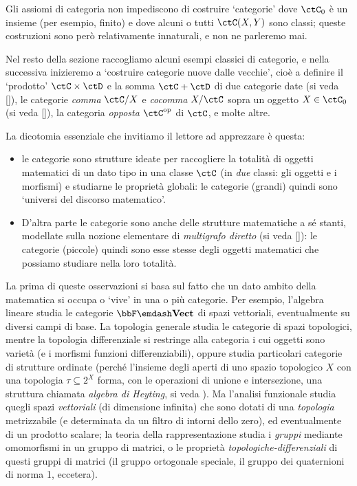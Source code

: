 \begin{remark}
	Gli assiomi di categoria non impediscono di costruire `categorie' dove \(\ctC_0\) è un insieme (per esempio, finito) e dove alcuni o tutti \(\Hom{\ctC}(X,Y)\) sono classi; queste costruzioni sono però relativamente innaturali, e non ne parleremo mai.
\end{remark}
Nel resto della sezione raccogliamo alcuni esempi classici di categorie, e nella successiva inizieremo a `costruire categorie nuove dalle vecchie', cioè a definire il `prodotto' \(\ctC\times\ctD\) e la somma \(\ctC+\ctD\) di due categorie date (si veda \autoref{}), le categorie \emph{comma} \(\ctC/X\) e \emph{cocomma} \(X/\ctC\) sopra un oggetto \(X\in\ctC_0\) (si veda \autoref{}), la categoria \emph{opposta} \(\ctC^\op\) di \(\ctC\), e molte altre.

La dicotomia essenziale che invitiamo il lettore ad apprezzare è questa:
\begin{itemize}
	\item le categorie sono strutture ideate per raccogliere la totalità di oggetti matematici di un dato tipo in una classe \(\ctC\) (in \emph{due} classi: gli oggetti e i morfismi) e studiarne le proprietà globali: le categorie (grandi) quindi sono `universi del discorso matematico'.
	\item D'altra parte le categorie sono anche delle strutture matematiche a sé stanti, modellate sulla nozione elementare di \emph{multigrafo diretto} (si veda \autoref{}): le categorie (piccole) quindi sono esse stesse degli oggetti matematici che possiamo studiare nella loro totalità.
\end{itemize}
La prima di queste osservazioni si basa sul fatto che un dato ambito della matematica si occupa o `vive' in una o più categorie. Per esempio, l'algebra lineare studia le categorie \(\bbF\emdash\ctVect\) di spazi vettoriali, eventualmente su diversi campi di base. La topologia generale studia le categorie di spazi topologici, mentre la topologia differenziale si restringe alla categoria i cui oggetti sono varietà (e i morfismi funzioni differenziabili), oppure studia particolari categorie di strutture ordinate (perché l'insieme degli aperti di uno spazio topologico \(X\) con una topologia \(\tau \subseteq 2^X\) forma, con le operazioni di unione e intersezione, una struttura chiamata \emph{algebra di Heyting}, si veda \cite{}). Ma l'analisi funzionale studia quegli spazi \emph{vettoriali} (di dimensione infinita) che sono dotati di una \emph{topologia} metrizzabile (e determinata da un filtro di intorni dello zero), ed eventualmente di un prodotto scalare; la teoria della rappresentazione studia i \emph{gruppi} mediante omomorfismi in un gruppo di matrici, o le proprietà \emph{topologiche-differenziali} di questi gruppi di matrici (il gruppo ortogonale speciale, il gruppo dei quaternioni di norma 1, eccetera).

